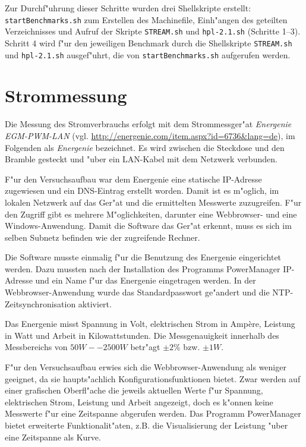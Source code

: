 \noindent
Zur Durchf"uhrung dieser Schritte wurden drei Shellskripte erstellt: \texttt{startBenchmarks.sh} zum Erstellen des Machinefile, Einh"angen des geteilten Verzeichnisses und Aufruf der Skripte \texttt{STREAM.sh} und \texttt{hpl-2.1.\-sh} (Schritte 1--3). Schritt 4 wird f"ur den jeweiligen Benchmark durch die Shellskripte \texttt{STREAM.sh} und \texttt{hpl-2.1.sh} ausgef"uhrt, die von \texttt{startBenchmarks.sh} aufgerufen werden. 

\section{Strommessung}
Die Messung des Stromverbrauchs erfolgt mit dem Strommessger"at \textit{Energenie EGM-PWM-LAN} (vgl. \url{http://energenie.com/item.aspx?id=6736&lang=de}), im Folgenden als \textit{Energenie} bezeichnet. Es wird zwischen die Steckdose und den Bramble gesteckt und "uber ein LAN-Kabel mit dem Netzwerk verbunden. 

F"ur den Versuchsaufbau war dem Energenie eine statische IP-Adresse zugewiesen und ein DNS-Eintrag erstellt worden. Damit ist es m"oglich, im lokalen Netzwerk auf das Ger"at und die ermittelten Messwerte zuzugreifen. F"ur den Zugriff gibt es mehrere M"oglichkeiten, darunter eine Webbrowser- und eine Windows-Anwendung. Damit die Software das Ger"at erkennt, muss es sich im selben Subnetz befinden wie der zugreifende Rechner. 

Die Software musste einmalig f"ur die Benutzung des Energenie eingerichtet werden. Dazu mussten nach der Installation des Programms PowerManager IP-Adresse und ein Name f"ur das Energenie eingetragen werden. In der Webbrowser-Anwendung wurde das Standardpasswort ge"andert und die NTP-Zeitsynchronisation aktiviert. 

Das Energenie misst Spannung in Volt, elektrischen Strom in Amp\`{e}re, Leistung in Watt und Arbeit in Kilowattstunden. Die Messgenauigkeit innerhalb des Messbereichs von $50 W -- 2500 W$ betr"agt $\pm 2\%$ bzw. $\pm 1 W$. %

F"ur den Versuchsaufbau erwies sich die Webbrowser-Anwendung als weniger geeignet, da sie haupts"achlich Konfigurationsfunktionen bietet. Zwar werden auf einer grafischen Oberfl"ache die jeweils aktuellen Werte f"ur Spannung, elektrischen Strom, Leistung und Arbeit angezeigt, doch es k"onnen keine Messwerte f"ur eine Zeitspanne abgerufen werden. Das Programm PowerManager bietet erweiterte Funktionalit"aten, z.B. die Visualisierung der Leistung "uber eine Zeitspanne als Kurve.  

